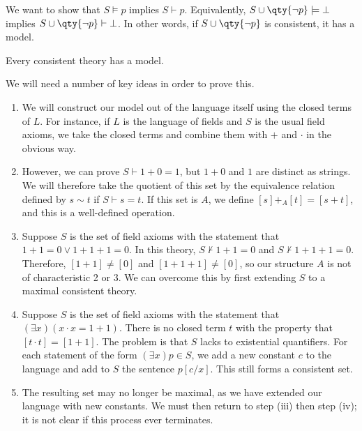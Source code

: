 We want to show that $S \models p$ implies $S \vdash p$.
Equivalently, $S \cup \qty{\neg p} \models \bot$ implies $S \cup \qty{\neg p} \vdash \bot$.
In other words, if $S \cup \qty{\neg p}$ is consistent, it has a model.
\begin{theorem}
    Every consistent theory has a model.
\end{theorem}
We will need a number of key ideas in order to prove this.
\begin{enumerate}
    \item We will construct our model out of the language itself using the closed terms of $L$.
    For instance, if $L$ is the language of fields and $S$ is the usual field axioms, we take the closed terms and combine them with $+$ and $\cdot$ in the obvious way.
    \item However, we can prove $S \vdash 1 + 0 = 1$, but $1 + 0$ and $1$ are distinct as strings.
    We will therefore take the quotient of this set by the equivalence relation defined by $s \sim t$ if $S \vdash s = t$.
    If this set is $A$, we define $[s] +_A [t] = [s + t]$, and this is a well-defined operation.
    \item Suppose $S$ is the set of field axioms with the statement that $1 + 1 = 0 \vee 1 + 1 + 1 = 0$.
    In this theory, $S \not\vdash 1 + 1 = 0$ and $S \not\vdash 1 + 1 + 1 = 0$.
    Therefore, $[1+1] \neq [0]$ and $[1+1+1] \neq [0]$, so our structure $A$ is not of characteristic 2 or 3.
    We can overcome this by first extending $S$ to a maximal consistent theory.
    \item Suppose $S$ is the set of field axioms with the statement that $(\exists x)(x \cdot x = 1 + 1)$.
    There is no closed term $t$ with the property that $[t\cdot t] = [1+1]$.
    The problem is that $S$ lacks  to existential quantifiers.
    For each statement of the form $(\exists x)p \in S$, we add a new constant $c$ to the language and add to $S$ the sentence $p[c/x]$.
    This still forms a consistent set.
    \item The resulting set may no longer be maximal, as we have extended our language with new constants.
    We must then return to step (iii) then step (iv); it is not clear if this process ever terminates.
\end{enumerate}
